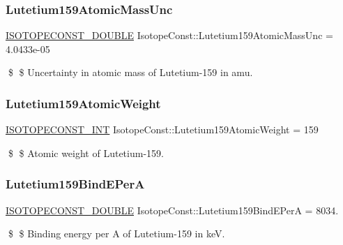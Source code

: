 \subsubsection{\texorpdfstring{Lutetium159\+Atomic\+Mass\+Unc}{Lutetium159AtomicMassUnc}}
{\footnotesize\ttfamily \mbox{\hyperlink{group___isotope_const-_macros_ga8f45a7272ce02c0b4c65c44636ed719a}{I\+S\+O\+T\+O\+P\+E\+C\+O\+N\+S\+T\+\_\+\+D\+O\+U\+B\+LE}} Isotope\+Const\+::\+Lutetium159\+Atomic\+Mass\+Unc = 4.\+0433e-\/05}

\$ \$ Uncertainty in atomic mass of Lutetium-\/159 in amu. \mbox{\label{group___isotope_const-_lutetium-_lu159_ga8d12e6675b0f123ddb6c61da18f70a5b}} 
\subsubsection{\texorpdfstring{Lutetium159\+Atomic\+Weight}{Lutetium159AtomicWeight}}
{\footnotesize\ttfamily \mbox{\hyperlink{group___isotope_const-_macros_ga5f18360b3e99483a35c32d789e62621c}{I\+S\+O\+T\+O\+P\+E\+C\+O\+N\+S\+T\+\_\+\+I\+NT}} Isotope\+Const\+::\+Lutetium159\+Atomic\+Weight = 159}

\$ \$ Atomic weight of Lutetium-\/159. \mbox{\label{group___isotope_const-_lutetium-_lu159_gaeacc9211854e1bac5e91a66c6049e053}} 
\subsubsection{\texorpdfstring{Lutetium159\+Bind\+E\+PerA}{Lutetium159BindEPerA}}
{\footnotesize\ttfamily \mbox{\hyperlink{group___isotope_const-_macros_ga8f45a7272ce02c0b4c65c44636ed719a}{I\+S\+O\+T\+O\+P\+E\+C\+O\+N\+S\+T\+\_\+\+D\+O\+U\+B\+LE}} Isotope\+Const\+::\+Lutetium159\+Bind\+E\+PerA = 8034.}

\$ \$ Binding energy per A of Lutetium-\/159 in keV. \mbox{\label{group___isotope_const-_lutetium-_lu159_ga54e6fe77926705d48e5cf6223b8674ab}} 

